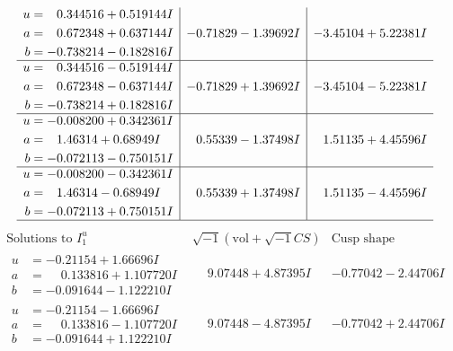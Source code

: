 \documentclass[1p]{elsarticle_modified}
\theoremstyle{definition}
\newcommand{\I}{\sqrt{-1}}
\begin{document}
$$\begin{array}{c|c|c}
\begin{aligned}
u &= \phantom{-}0.344516 + 0.519144 I \\
a &= \phantom{-}0.672348 + 0.637144 I \\
b &= -0.738214 - 0.182816 I\end{aligned}
 & -0.71829 - 1.39692 I & -3.45104 + 5.22381 I \\ \hline\begin{aligned}
u &= \phantom{-}0.344516 - 0.519144 I \\
a &= \phantom{-}0.672348 - 0.637144 I \\
b &= -0.738214 + 0.182816 I\end{aligned}
 & -0.71829 + 1.39692 I & -3.45104 - 5.22381 I \\ \hline\begin{aligned}
u &= -0.008200 + 0.342361 I \\
a &= \phantom{-}1.46314 + 0.68949 I \\
b &= -0.072113 - 0.750151 I\end{aligned}
 & \phantom{-}0.55339 - 1.37498 I & \phantom{-}1.51135 + 4.45596 I \\ \hline\begin{aligned}
u &= -0.008200 - 0.342361 I \\
a &= \phantom{-}1.46314 - 0.68949 I \\
b &= -0.072113 + 0.750151 I\end{aligned}
 & \phantom{-}0.55339 + 1.37498 I & \phantom{-}1.51135 - 4.45596 I\\
 \hline 
 \end{array}$$\newpage$$\begin{array}{c|c|c}  
\text{Solutions to }I^u_{1}& \I (\text{vol} + \sqrt{-1}CS) & \text{Cusp shape}\\
 \hline 
\begin{aligned}
u &= -0.21154 + 1.66696 I \\
a &= \phantom{-}0.133816 + 1.107720 I \\
b &= -0.091644 - 1.122210 I\end{aligned}
 & \phantom{-}9.07448 + 4.87395 I & -0.77042 - 2.44706 I \\ \hline\begin{aligned}
u &= -0.21154 - 1.66696 I \\
a &= \phantom{-}0.133816 - 1.107720 I \\
b &= -0.091644 + 1.122210 I\end{aligned}
 & \phantom{-}9.07448 - 4.87395 I & -0.77042 + 2.44706 I \\ \hline\begin{aligned}

\end{aligned}
\end{array}$$
\end{document}
